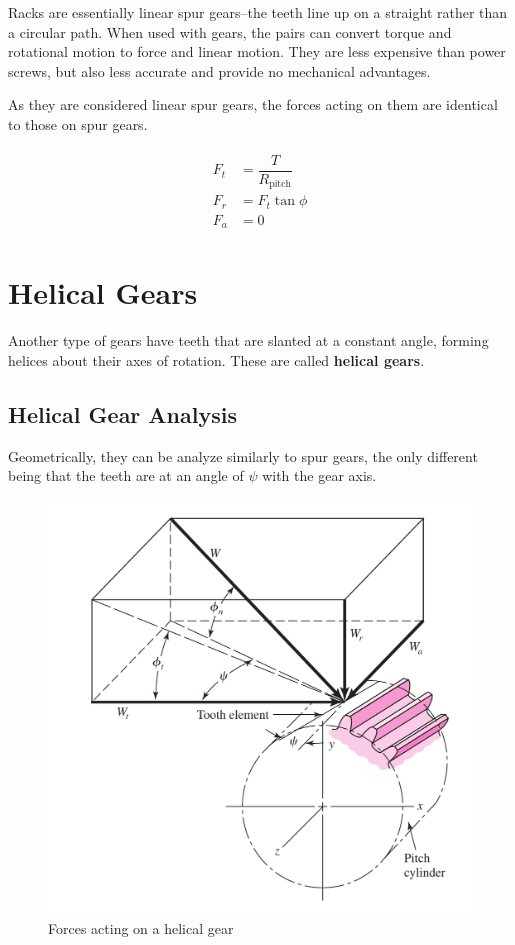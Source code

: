 \documentclass[a4paper,openany]{tufte-book}
\begin{document}
Racks are essentially linear spur gears--the teeth line up on a straight rather than a circular path. When used with gears, the pairs can convert torque and rotational motion to force and linear motion. They are less expensive than power screws, but also less accurate and provide no mechanical advantages.

As they are considered linear spur gears, the forces acting on them are identical to those on spur gears.

\begin{align}
  \begin{array}{ll}
  F_{t} &= \dfrac{T}{R_{\text{pitch}}} \\
  F_{r} &= F_t \tan \phi \\
  F_{a} &= 0
  \end{array}
\end{align}

\chapter{Helical Gears}
\label{sec:orge13a227}

Another type of gears have teeth that are slanted at a constant angle, forming helices about their axes of rotation. These are called \textbf{helical gears}.


\section{Helical Gear Analysis}
\label{sec:orgadb6395}

Geometrically, they can be analyze similarly to spur gears, the only different being that the teeth are at an angle of \(\psi\) with the gear axis.

\begin{figure}[htbp]
\centering
\includegraphics[width=.9\linewidth]{./pictures/Gears/helical-gear-forces.png}
\caption{\label{fig: helical gear forces}Forces acting on a helical gear}
\end{figure}
\end{document}
